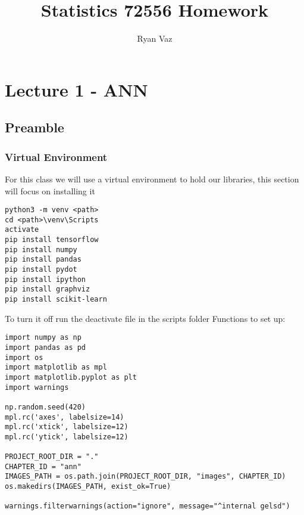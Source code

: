 \documentclass[article]{llncs}
\begin{document}
%
\graphicspath{ {./images/} }
\title{Statistics 72556 Homework}
%
%
\author{Ryan Vaz}
%
%
%
\maketitle              %
%

%
\begingroup
\let\clearpage\relax
\tableofcontents*
\endgroup
%

\section{Lecture 1 - ANN}
\subsection{Preamble}
\subsubsection{Virtual Environment}
For this class we will use a virtual environment to hold our libraries, this section will focus on installing it\\

\begin{verbatim}
python3 -m venv <path>
cd <path>\venv\Scripts
activate
pip install tensorflow
pip install numpy
pip install pandas
pip install pydot
pip install ipython
pip install graphviz
pip install scikit-learn
\end{verbatim}
\noindent To turn it off run the deactivate file in the scripts folder 
Functions to set up:
\begin{verbatim}
import numpy as np
import pandas as pd
import os
import matplotlib as mpl
import matplotlib.pyplot as plt
import warnings

np.random.seed(420)
mpl.rc('axes', labelsize=14)
mpl.rc('xtick', labelsize=12)
mpl.rc('ytick', labelsize=12)

PROJECT_ROOT_DIR = "."
CHAPTER_ID = "ann"
IMAGES_PATH = os.path.join(PROJECT_ROOT_DIR, "images", CHAPTER_ID)
os.makedirs(IMAGES_PATH, exist_ok=True)

warnings.filterwarnings(action="ignore", message="^internal gelsd")
\end{verbatim}
\end{document}
